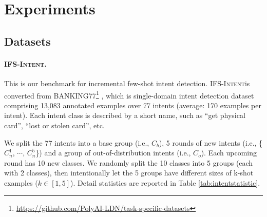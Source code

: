 \documentclass[11pt]{article}
\newcommand{\intentdata}{\textsc{IFS-Intent}}
\newcommand{\relationdata}{\textsc{IFS-Relation}}
\begin{document}
\section{Experiments}

\subsection{Datasets}

\paragraph{\intentdata.} This is our benchmark for incremental few-shot intent detection. \intentdata\enspace is converted from BANKING77\footnote{\url{https://github.com/PolyAI-LDN/task-specific-datasets}} \cite{casanueva2020efficient}, which is single-domain intent
detection dataset comprising 13,083 annotated
examples over 77 intents (average: 170 examples per intent). Each intent class is described by a short name, such as ``get physical card'', ``lost or stolen card'', etc.

We split the 77 intents into a base group (i.e., $C_b$), 5 rounds of new intents (i.e., \{$C_n^1$, $\cdots$, $C_n^5$\}) and a group of out-of-distribution intents (i.e., $C_o$). Each upcoming round has 10 new classes. We randomly split the 10 classes into 5 groups (each with 2 classes), then intentionally let the 5 groups have different sizes of k-shot examples ($k\in [1,5]$). Detail statistics are reported in Table \ref{tab:intentstatistic}. 

\end{document}
